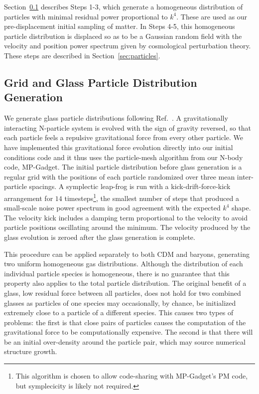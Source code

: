 \documentclass[a4paper,11pt]{article}
\begin{document}
Section~\ref{sec:glass} describes Steps 1-3, which generate a homogeneous distribution of particles with minimal residual power proportional to $k^4$. These are used as our pre-displacement initial sampling of matter. In Steps 4-5, this homogeneous particle distribution is displaced so as to be a Gaussian random field with the velocity and position power spectrum given by cosmological perturbation theory. These steps are described in Section~\ref{sec:particles}.

\subsection{Grid and Glass Particle Distribution Generation}
\label{sec:glass}

We generate glass particle distributions following Ref.~\cite{White:1994}. A gravitationally interacting N-particle system is evolved with the sign of gravity reversed, so that each particle feels a repulsive gravitational force from every other particle. We have implemented this gravitational force evolution directly into our initial conditions code and it thus uses the particle-mesh algorithm from our N-body code, MP-Gadget. The initial particle distribution before glass generation is a regular grid with the positions of each particle randomized over three mean inter-particle spacings. A symplectic leap-frog is run with a kick-drift-force-kick arrangement for $14$ timesteps\footnote{This algorithm is chosen to allow code-sharing with MP-Gadget's PM code, but symplecicity is likely not required.}, the smallest number of steps that produced a small-scale noise power spectrum in good agreement with the expected $k^4$ shape. The velocity kick includes a damping term proportional to the velocity to avoid particle positions oscillating around the minimum. The velocity produced by the glass evolution is zeroed after the glass generation is complete.

This procedure can be applied separately to both CDM and baryons, generating two uniform homogeneous gas distributions.
Although the distribution of each individual particle species is homogeneous, there is no guarantee that this property also applies to the total particle distribution. The original benefit of a glass, low residual force between all particles, does not hold for two combined glasses \cite{Yoshida:2003} as particles of one species may occasionally, by chance, be initialized extremely close to a particle of a different species. This causes two types of problems: the first is that close pairs of particles causes the computation of the gravitational force to be computationally expensive. The second is that there will be an initial over-density around the particle pair, which may source numerical structure growth.
\end{document}
